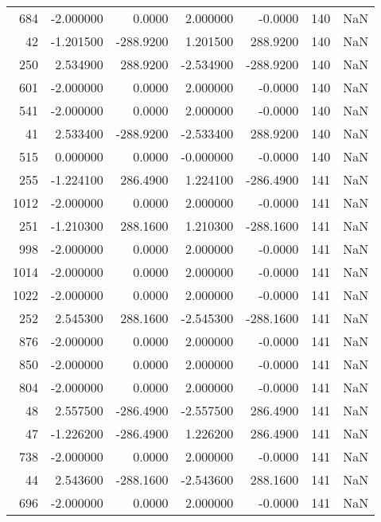 \begin{tabular}{rrrrrrr}
 684 &   -2.000000 &    0.0000 &    2.000000 &     -0.0000 &         140 & NaN \\
  42 &   -1.201500 & -288.9200 &    1.201500 &    288.9200 &         140 & NaN \\
 250 &    2.534900 &  288.9200 &   -2.534900 &   -288.9200 &         140 & NaN \\
 601 &   -2.000000 &    0.0000 &    2.000000 &     -0.0000 &         140 & NaN \\
 541 &   -2.000000 &    0.0000 &    2.000000 &     -0.0000 &         140 & NaN \\
  41 &    2.533400 & -288.9200 &   -2.533400 &    288.9200 &         140 & NaN \\
 515 &    0.000000 &    0.0000 &   -0.000000 &     -0.0000 &         140 & NaN \\
 255 &   -1.224100 &  286.4900 &    1.224100 &   -286.4900 &         141 & NaN \\
1012 &   -2.000000 &    0.0000 &    2.000000 &     -0.0000 &         141 & NaN \\
 251 &   -1.210300 &  288.1600 &    1.210300 &   -288.1600 &         141 & NaN \\
 998 &   -2.000000 &    0.0000 &    2.000000 &     -0.0000 &         141 & NaN \\
1014 &   -2.000000 &    0.0000 &    2.000000 &     -0.0000 &         141 & NaN \\
1022 &   -2.000000 &    0.0000 &    2.000000 &     -0.0000 &         141 & NaN \\
 252 &    2.545300 &  288.1600 &   -2.545300 &   -288.1600 &         141 & NaN \\
 876 &   -2.000000 &    0.0000 &    2.000000 &     -0.0000 &         141 & NaN \\
 850 &   -2.000000 &    0.0000 &    2.000000 &     -0.0000 &         141 & NaN \\
 804 &   -2.000000 &    0.0000 &    2.000000 &     -0.0000 &         141 & NaN \\
  48 &    2.557500 & -286.4900 &   -2.557500 &    286.4900 &         141 & NaN \\
  47 &   -1.226200 & -286.4900 &    1.226200 &    286.4900 &         141 & NaN \\
 738 &   -2.000000 &    0.0000 &    2.000000 &     -0.0000 &         141 & NaN \\
  44 &    2.543600 & -288.1600 &   -2.543600 &    288.1600 &         141 & NaN \\
 696 &   -2.000000 &    0.0000 &    2.000000 &     -0.0000 &         141 & NaN \\

\end{tabular}
